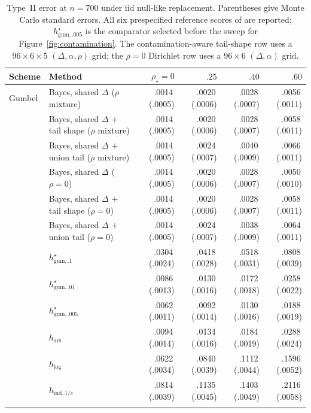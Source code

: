 \documentclass[11pt]{article}
\newcommand{\mcse}[2]{\mbox{#1\,{\fontsize{7}{8}\selectfont(#2)}}}
\begin{document}
\begin{table}[htbp]
\centering
\small
\caption{Type~II error at $n=700$ under iid null-like replacement.  Parentheses give Monte Carlo standard errors.  All six prespecified reference scores of \citet{li2025framework} are reported; $h^\star_{\mathrm{gum},.005}$ is the comparator selected before the sweep for Figure~\ref{fig:contamination}.  The contamination-aware tail-shape row uses a $96\times6\times5$ $(\Delta,\alpha,\rho)$ grid; the $\rho=0$ Dirichlet row uses a $96\times6$ $(\Delta,\alpha)$ grid.  }
\label{tab:contamination}
\begin{tabular}{@{}llrrrr@{}}
\toprule
Scheme & Method & $\rho_\star=0$ & $.25$ & $.40$ & $.60$ \\
\midrule
Gumbel & Bayes, shared $\Delta$ ($\rho$ mixture) & \mcse{.0014}{.0005} & \mcse{.0020}{.0006} & \mcse{.0028}{.0007} & \mcse{.0056}{.0011} \\
 & Bayes, shared $\Delta$ $+$ tail shape ($\rho$ mixture) & \mcse{.0014}{.0005} & \mcse{.0020}{.0006} & \mcse{.0028}{.0007} & \mcse{.0058}{.0011} \\
 & Bayes, shared $\Delta$ $+$ union tail ($\rho$ mixture) & \mcse{.0014}{.0005} & \mcse{.0024}{.0007} & \mcse{.0040}{.0009} & \mcse{.0066}{.0011} \\
 & Bayes, shared $\Delta$ ($\rho=0$) & \mcse{.0014}{.0005} & \mcse{.0020}{.0006} & \mcse{.0028}{.0007} & \mcse{.0050}{.0010} \\
 & Bayes, shared $\Delta$ $+$ tail shape ($\rho=0$) & \mcse{.0014}{.0005} & \mcse{.0020}{.0006} & \mcse{.0028}{.0007} & \mcse{.0058}{.0011} \\
 & Bayes, shared $\Delta$ $+$ union tail ($\rho=0$) & \mcse{.0014}{.0005} & \mcse{.0024}{.0007} & \mcse{.0038}{.0009} & \mcse{.0064}{.0011} \\
 & $h^\star_{\mathrm{gum},.1}$ & \mcse{.0304}{.0024} & \mcse{.0418}{.0028} & \mcse{.0518}{.0031} & \mcse{.0808}{.0039} \\
 & $h^\star_{\mathrm{gum},.01}$ & \mcse{.0086}{.0013} & \mcse{.0130}{.0016} & \mcse{.0172}{.0018} & \mcse{.0258}{.0022} \\
 & $h^\star_{\mathrm{gum},.005}$ & \mcse{.0062}{.0011} & \mcse{.0092}{.0014} & \mcse{.0130}{.0016} & \mcse{.0188}{.0019} \\
 & $h_{\mathrm{ars}}$ & \mcse{.0094}{.0014} & \mcse{.0134}{.0016} & \mcse{.0184}{.0019} & \mcse{.0288}{.0024} \\
 & $h_{\log}$ & \mcse{.0622}{.0034} & \mcse{.0840}{.0039} & \mcse{.1112}{.0044} & \mcse{.1596}{.0052} \\
 & $h_{\mathrm{ind},1/e}$ & \mcse{.0814}{.0039} & \mcse{.1135}{.0045} & \mcse{.1403}{.0049} & \mcse{.2116}{.0058} \\
\addlinespace
\bottomrule
\end{tabular}
\end{table}
\end{document}
